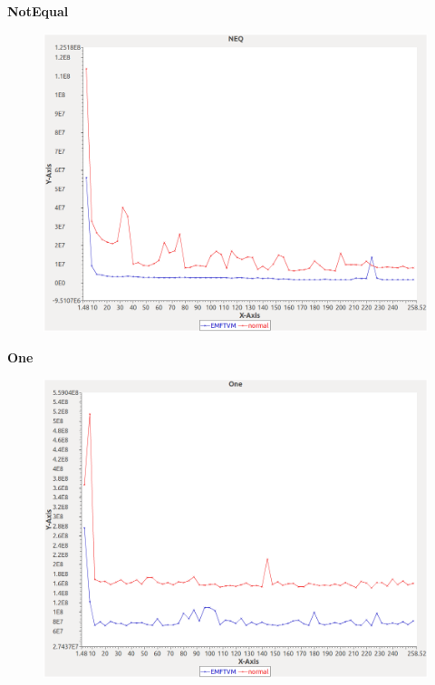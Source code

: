 \noindent\textbf{NotEqual}

\begin{figure}[h]
\centering
\includegraphics[width=\textwidth]{../graphs/orderedset/NEQ}
\end{figure}
\pagebreak

\noindent\textbf{One}

\begin{figure}[h]
\centering
\includegraphics[width=\textwidth]{../graphs/orderedset/One}
\end{figure}
\pagebreak

